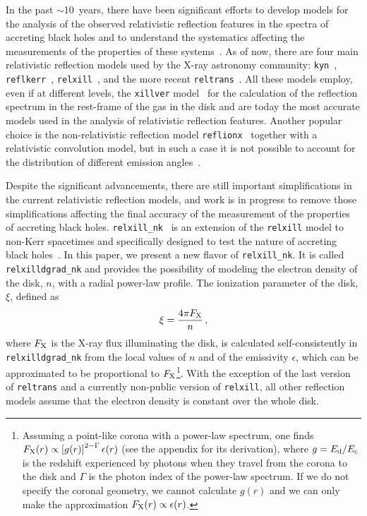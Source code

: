 \documentclass[twocolumn]{emulateapj}
\newcommand{\be}{\begin{eqnarray}}
\newcommand{\ee}{\end{eqnarray}}
\begin{document}
In the past $\sim$10~years, there have been significant efforts to develop models for the analysis of the observed relativistic reflection features in the spectra of accreting black holes and to understand the systematics affecting the measurements of the properties of these systems~\citep[see, e.g.,][and references therein]{2020arXiv201104792B}. As of now, there are four main relativistic reflection models used by the X-ray astronomy community: {\tt kyn}~\citep{2004ApJS..153..205D}, {\tt reflkerr}~\citep{2008MNRAS.386..759N,2019MNRAS.485.2942N},  {\tt relxill}~\citep{2013MNRAS.430.1694D,2014ApJ...782...76G}, and the more recent {\tt reltrans}~\citep{2019MNRAS.488..324I}. All these models employ, even if at different levels, the {\tt xillver} model~\citep{2010ApJ...718..695G,2013ApJ...768..146G} for the calculation of the reflection spectrum in the rest-frame of the gas in the disk and are today the most accurate models used in the analysis of relativistic reflection features. Another popular choice is the non-relativistic reflection model {\tt reflionx}~\citep{2005MNRAS.358..211R} together with a relativistic convolution model, but in such a case it is not possible to account for the distribution of different emission angles~\citep{2014ApJ...782...76G,2020MNRAS.498.3565T}.


Despite the significant advancements, there are still important simplifications in the current relativistic reflection models, and work is in progress to remove those simplifications affecting the final accuracy of the measurement of the properties of accreting black holes. {\tt relxill\_nk}~\citep{2017ApJ...842...76B,2019ApJ...878...91A,2020ApJ...899...80A} is an extension of the {\tt relxill} model to non-Kerr spacetimes and specifically designed to test the nature of accreting black holes~\citep{2018PhRvL.120e1101C,2019ApJ...884..147Z,2019ApJ...874..135T,2019ApJ...875...56T,2021ApJ...907...31T,2021ApJ...913...79T,2021arXiv210610982T}. In this paper, we present a new flavor of {\tt relxill\_nk}. It is called {\tt relxilldgrad\_nk} and provides the possibility of modeling the electron density of the disk, $n$, with a radial power-law profile. The ionization parameter of the disk, $\xi$, defined as
\be\label{eq-xi}
\xi = \frac{4 \pi F_{\rm X}}{n} \, ,
\ee
where $F_{\rm X}$ is the X-ray flux illuminating the disk, is calculated self-consistently in {\tt relxilldgrad\_nk} from the local values of $n$ and of the emissivity $\epsilon$, which can be approximated to be proportional to $F_{\rm X}$\footnote{Assuming a point-like corona with a power-law spectrum, one finds $F_{\rm X} (r) \propto \left[ g(r) \right]^{2-\Gamma}\epsilon(r)$ (see the appendix for its derivation), where $g = E_{\rm d}/E_{\rm c}$ is the redshift experienced by photons when they travel from the corona to the disk and $\Gamma$ is the photon index of the power-law spectrum. If we do not specify the coronal geometry, we cannot calculate $g(r)$ and we can only make the approximation $F_{\rm X} (r) \propto \epsilon(r)$.}. With the exception of the last version of {\tt reltrans} \citep{2021MNRAS.507...55M} and a currently non-public version of {\tt relxill}, all other reflection models assume that the electron density is constant over the whole disk. 
\end{document}
